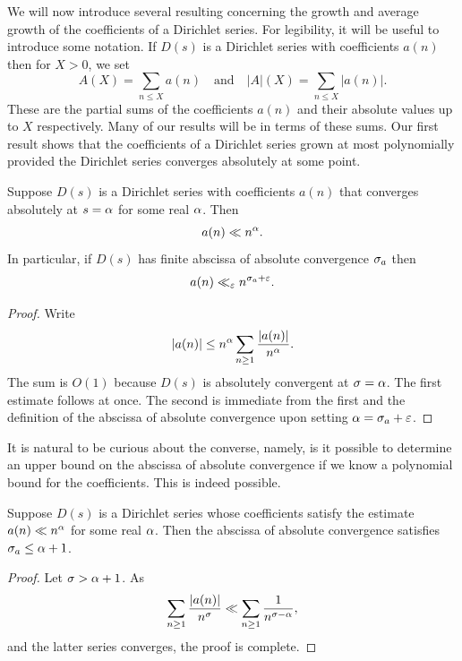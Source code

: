     We will now introduce several resulting concerning the growth and average growth of the coefficients of a Dirichlet series. For legibility, it will be useful to introduce some notation. If \(D(s)\) is a Dirichlet series with coefficients \(a(n)\) then for \(X > 0\), we set
    \[
      A(X) = \sum_{n \le X}a(n) \quad \text{and} \quad |A|(X) = \sum_{n \le X}|a(n)|.
    \]
    These are the partial sums of the coefficients \(a(n)\) and their absolute values up to \(X\) respectively. Many of our results will be in terms of these sums. Our first result shows that the coefficients of a Dirichlet series grown at most polynomially provided the Dirichlet series converges absolutely at some point. 
    
    \begin{proposition}\label{prop:Dirichlet_series_polynomial_bound_from_absolute_convergence}
      Suppose \(D(s)\) is a Dirichlet series with coefficients \(a(n)\) that converges absolutely at \(s = \alpha\) for some real \(\alpha\). Then
      \[
        a(n) \ll n^{\alpha}.
      \]
      In particular, if \(D(s)\) has finite abscissa of absolute convergence \(\sigma_{a}\) then
      \[
        a(n) \ll_{\varepsilon} n^{\sigma_{a}+\varepsilon}.
      \]
    \end{proposition}
    \begin{proof}
      Write
      \[
        |a(n)| \le n^{\alpha}\sum_{n \ge 1}\frac{|a(n)|}{n^{\alpha}}.
      \]
      The sum is \(O(1)\) because \(D(s)\) is absolutely convergent at \(\sigma = \alpha\). The first estimate follows at once. The second is immediate from the first and the definition of the abscissa of absolute convergence upon setting \(\alpha = \sigma_{a}+\varepsilon\).
    \end{proof}
    
    It is natural to be curious about the converse, namely, is it possible to determine an upper bound on the abscissa of absolute convergence if we know a polynomial bound for the coefficients. This is indeed possible.
    
    \begin{proposition}\label{prop:Dirichlet_series_convergence_polynomial_bound}
      Suppose \(D(s)\) is a Dirichlet series whose coefficients satisfy the estimate \(a(n) \ll n^{\alpha}\) for some real \(\alpha\). Then the abscissa of absolute convergence satisfies \(\sigma_{a} \le \alpha+1\).
    \end{proposition}
    \begin{proof}
      Let \(\sigma > \alpha+1\). As
      \[
        \sum_{n \ge 1}\frac{|a(n)|}{n^{\sigma}} \ll \sum_{n \ge 1}\frac{1}{n^{\sigma-\alpha}},
      \]
      and the latter series converges, the proof is complete.
    \end{proof}

